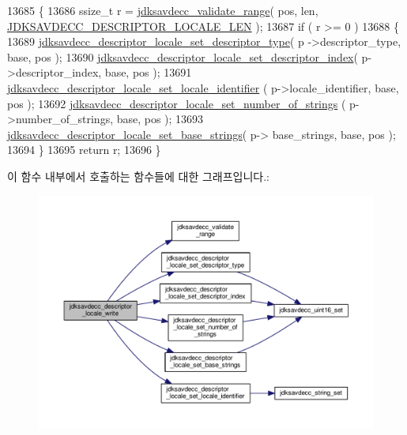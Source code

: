 \begin{DoxyCode}
13685 \{
13686     ssize\_t r = \hyperlink{group__util_ga9c02bdfe76c69163647c3196db7a73a1}{jdksavdecc\_validate\_range}( pos, len, 
      \hyperlink{group__descriptor__locale_gaa79c61cd4ccd2cc3b8d73d8e8c17b48b}{JDKSAVDECC\_DESCRIPTOR\_LOCALE\_LEN} );
13687     \textcolor{keywordflow}{if} ( r >= 0 )
13688     \{
13689         \hyperlink{group__descriptor__locale_gafe4a3ffbfdd93ba977602ddc8a749ca2}{jdksavdecc\_descriptor\_locale\_set\_descriptor\_type}( p
      ->descriptor\_type, base, pos );
13690         \hyperlink{group__descriptor__locale_ga0a32fbd7e1e05dcc858353510fdc5824}{jdksavdecc\_descriptor\_locale\_set\_descriptor\_index}(
       p->descriptor\_index, base, pos );
13691         \hyperlink{group__descriptor__locale_ga7081f71b7ebc7e06cda7af8ea3ae1bcc}{jdksavdecc\_descriptor\_locale\_set\_locale\_identifier}
      ( p->locale\_identifier, base, pos );
13692         \hyperlink{group__descriptor__locale_ga353ead3b1f3bc011c18125a1f65a5237}{jdksavdecc\_descriptor\_locale\_set\_number\_of\_strings}
      ( p->number\_of\_strings, base, pos );
13693         \hyperlink{group__descriptor__locale_gaa9eb2847a7bf41b629c7ba5da3f0e072}{jdksavdecc\_descriptor\_locale\_set\_base\_strings}( p->
      base\_strings, base, pos );
13694     \}
13695     \textcolor{keywordflow}{return} r;
13696 \}
\end{DoxyCode}


이 함수 내부에서 호출하는 함수들에 대한 그래프입니다.\+:
\nopagebreak
\begin{figure}[H]
\begin{center}
\leavevmode
\includegraphics[width=350pt]{group__descriptor__locale_ga2235183f20105acfbd974c7d1bbfd385_cgraph}
\end{center}
\end{figure}


